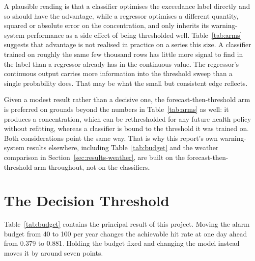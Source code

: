 \documentclass[12pt,a4paper]{report}
\begin{document}
A plausible reading is that a classifier optimises the exceedance label directly and so should have the advantage, while a regressor optimises a different quantity, squared or absolute error on the concentration, and only inherits its warning-system performance as a side effect of being thresholded well. Table~\ref{tab:arms} suggests that advantage is not realised in practice on a series this size. A classifier trained on roughly the same few thousand rows has little more signal to find in the label than a regressor already has in the continuous value. The regressor's continuous output carries more information into the threshold sweep than a single probability does. That may be what the small but consistent edge reflects.

Given a modest result rather than a decisive one, the forecast-then-threshold arm is preferred on grounds beyond the numbers in Table~\ref{tab:arms} as well: it produces a concentration, which can be rethresholded for any future health policy without refitting, whereas a classifier is bound to the threshold it was trained on. Both considerations point the same way. That is why this report's own warning-system results elsewhere, including Table~\ref{tab:budget} and the weather comparison in Section~\ref{sec:results-weather}, are built on the forecast-then-threshold arm throughout, not on the classifiers.

\section{The Decision Threshold}
\label{sec:threshold}

\begin{table}[htbp]
\centering
\caption{Best hit rate available within a budget of alarms per year, with the
event fixed at the health threshold and only the decision threshold varying.
Persistence and climatology are also broken out at $h=3$, the two specific
models the discussion of this table names directly, so those claims can be
checked against a printed cell rather than the prose alone.}
\label{tab:budget}
\footnotesize
\resizebox{\textwidth}{!}{}
\end{table}

Table~\ref{tab:budget} contains the principal result of this project. Moving the
alarm budget from 40 to 100 per year changes the achievable hit rate at one day
ahead from 0.379 to 0.881. Holding the budget fixed and changing the model
instead moves it by around seven points.
\end{document}
